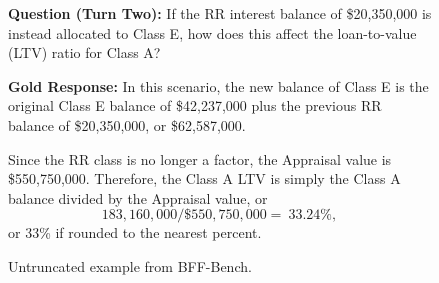 \begin{figure}[ht!]
\begin{tcolorbox}[
    boxsep=1pt, left=2pt,right=2pt,top=2pt,bottom=2pt,
    colback=blue!5!white, colframe=blue!40!black,
    before skip=3pt, after skip=1pt, sharp corners
]
\small
\textbf{Question (Turn Two):}  
If the RR interest balance of \$20,350,000 is instead allocated to Class E, how does this affect the loan-to-value (LTV) ratio for Class A?
\end{tcolorbox}

\begin{tcolorbox}[
    boxsep=1pt, left=2pt,right=2pt,top=2pt,bottom=2pt,
    colback=green!2!white, colframe=green!25!black,
    before skip=1pt, after skip=2pt, sharp corners=downhill,
]
\small
\textbf{Gold Response:}
In this scenario, the new balance of Class E is the original Class E balance of  \$42,237,000 plus the previous RR balance of \$20,350,000, or \$62,587,000.

Since the RR class is no longer a factor, the Appraisal value is \$550,750,000. Therefore, the Class A LTV is simply the Class A balance divided by the Appraisal value, or 
\[
183,160,000 / \$550,750,000 = ~33.24\%,
\]
or 33\% if rounded to the nearest percent. 

\end{tcolorbox}

\caption{Untruncated example from BFF-Bench.}
\label{fig:bffbench-sample-full-2}
\end{figure}
